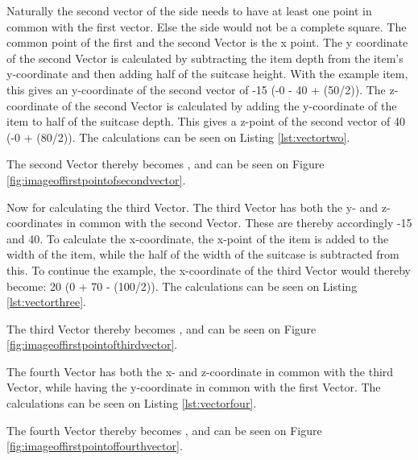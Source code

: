 Naturally the second vector of the side needs to have at least one point in common with the first vector. Else the side would not be a complete square. 
The common point of the first and the second Vector is the x point. 
The y coordinate of the second Vector is calculated by subtracting the item depth from the item's y-coordinate and then adding half of the suitcase height. With the example item, this gives an y-coordinate of the second vector of -15 (-0 - 40 + (50/2)).
The z-coordinate of the second Vector is calculated by adding the y-coordinate of the item to half of the suitcase depth. This gives a z-point of the second vector of 40 (-0 + (80/2)). The calculations can be seen on Listing \ref{lst:vectortwo}.


The second Vector thereby becomes , and can be seen on Figure \ref{fig:imageoffirstpointofsecondvector}.

Now for calculating the third Vector. The third Vector has both the y- and z- coordinates in common with the second Vector. These are thereby accordingly -15 and 40. 
To calculate the x-coordinate, the x-point of the item is added to the width of the item, while the half of the width of the suitcase is subtracted from this. To continue the example, the x-coordinate of the third Vector would thereby become: 20 (0 + 70 - (100/2)). The calculations can be seen on Listing \ref{lst:vectorthree}.


The third Vector thereby becomes , and can be seen on Figure \ref{fig:imageoffirstpointofthirdvector}.


The fourth Vector has both the x- and z-coordinate in common with the third Vector, while having the y-coordinate in common with the first Vector. The calculations can be seen on Listing \ref{lst:vectorfour}.


The fourth Vector thereby becomes , and can be seen on Figure \ref{fig:imageoffirstpointoffourthvector}.



